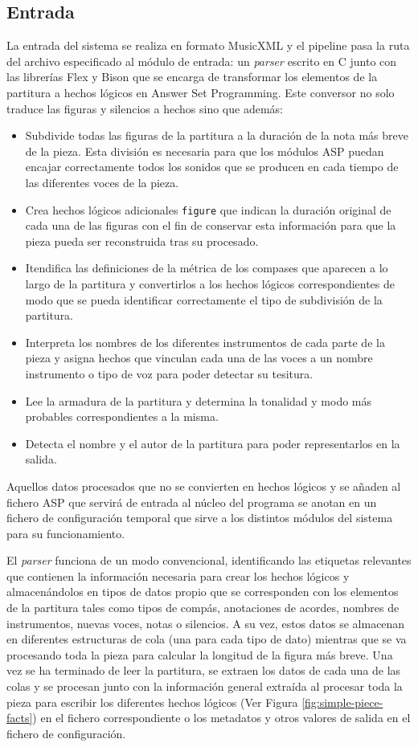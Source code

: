 \subsection{Entrada}
La entrada del sistema se realiza en formato MusicXML y el pipeline pasa la ruta del archivo especificado al módulo de entrada: un \textit{parser} escrito en C junto con las librerías Flex y Bison que se encarga de transformar los elementos de la partitura a hechos lógicos en Answer Set Programming. Este conversor no solo traduce las figuras y silencios a hechos sino que además:
\begin{itemize}
 	\item Subdivide todas las figuras de la partitura a la duración de la nota más breve de la pieza. Esta división es necesaria para que los módulos ASP puedan encajar correctamente todos los sonidos que se producen en cada tiempo de las diferentes voces de la pieza.
 	\item Crea hechos lógicos adicionales \texttt{figure} que indican la duración original de cada una de las figuras con el fin de conservar esta información para que la pieza pueda ser reconstruida tras su procesado.
 	\item Itendifica las definiciones de la métrica de los compases que aparecen a lo largo de la partitura y convertirlos a los hechos lógicos correspondientes de modo que se pueda identificar correctamente el tipo de subdivisión de la partitura.
 	\item Interpreta los nombres de los diferentes instrumentos de cada parte de la pieza y asigna hechos que vinculan cada una de las voces a un nombre instrumento o tipo de voz para poder detectar su tesitura.
 	\item Lee la armadura de la partitura y determina la tonalidad y modo más probables correspondientes a la misma.
 	\item Detecta el nombre y el autor de la partitura para poder representarlos en la salida.
\end{itemize}
Aquellos datos procesados que no se convierten en hechos lógicos y se añaden al fichero ASP que servirá de entrada al núcleo del programa se anotan en un fichero de configuración temporal que sirve a los distintos módulos del sistema para su funcionamiento.

El \textit{parser} funciona de un modo convencional, identificando las etiquetas relevantes que contienen la información necesaria para crear los hechos lógicos y almacenándolos en tipos de datos propio que se corresponden con los elementos de la partitura tales como tipos de compás, anotaciones de acordes, nombres de instrumentos, nuevas voces, notas o silencios. A su vez, estos datos se almacenan en diferentes estructuras de cola (una para cada tipo de dato) mientras que se va procesando toda la pieza para calcular la longitud de la figura más breve. Una vez se ha terminado de leer la partitura, se extraen los datos de cada una de las colas y se procesan junto con la información general extraída al procesar toda la pieza para escribir los diferentes hechos lógicos (Ver Figura \ref{fig:simple-piece-facts}) en el fichero correspondiente o los metadatos y otros valores de salida en el fichero de configuración.

